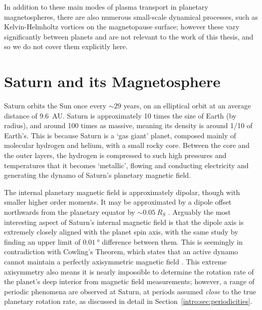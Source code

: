 In addition to these main modes of plasma transport in planetary magnetospheres, there are also numerous small-scale dynamical processes, such as Kelvin-Helmholtz vortices on the magnetopause surface; however these vary significantly between planets and are not relevant to the work of this thesis, and so we do not cover them explicitly here.

\section{Saturn and its Magnetosphere}\label{intro:sec:saturn}
Saturn orbits the Sun once every ${\sim}29$ years, on an elliptical orbit at an average distance of \SI{9.6}{AU}. Saturn is approximately 10 times the size of Earth (by radius), and around 100 times as massive, meaning its density is around 1/10 of Earth's. This is because Saturn is a `gas giant' planet, composed mainly of molecular hydrogen and helium, with a small rocky core. Between the core and the outer layers, the hydrogen is compressed to such high pressures and temperatures that it becomes `metallic', flowing and conducting electricity and generating the dynamo of Saturn's planetary magnetic field.

The internal planetary magnetic field is approximately dipolar, though with smaller higher order moments. It may be approximated by a dipole offset northwards from the planetary equator by ${\sim}\SI{0.05}{R_S}$ \citep{dougherty2018}. Arguably the most interesting aspect of Saturn's internal magnetic field is that the dipole axis is extremely closely aligned with the planet spin axis, with the same study by \citet{dougherty2018} finding an upper limit of $\SI{0.01}{\degree}$ difference between them. This is seemingly in contradiction with Cowling's Theorem, which states that an active dynamo cannot maintain a perfectly axisymmetric magnetic field \citep{cowling1933}. This extreme axisymmetry also means it is nearly impossible to determine the rotation rate of the planet's deep interior from magnetic field measurements; however, a range of periodic phenomena are observed at Saturn, at periods assumed \textit{close} to the true planetary rotation rate, as discussed in detail in Section~\ref{intro:sec:periodicities}.

